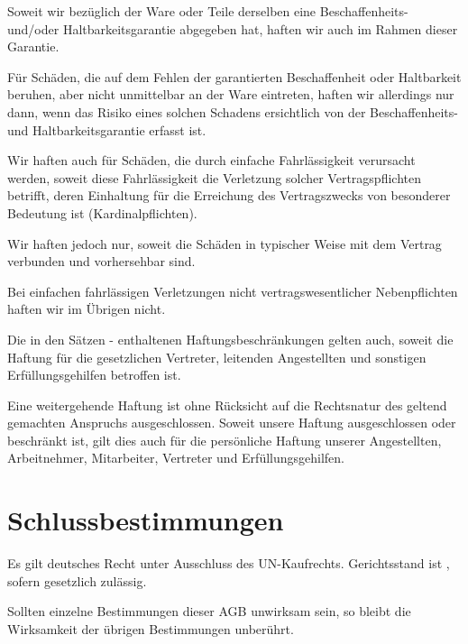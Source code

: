 \documentclass[fontsize=12pt,parskip=half]{scrartcl}
\begin{document}
\begin{contract}
Soweit wir bezüglich der Ware oder Teile derselben eine Beschaffenheits- und/oder Haltbarkeitsgarantie abgegeben hat, haften wir auch im Rahmen dieser Garantie. 

Für Schäden, die auf dem Fehlen der garantierten Beschaffenheit oder Haltbarkeit beruhen, aber nicht unmittelbar an der Ware eintreten, haften wir allerdings nur dann, wenn das Risiko eines solchen Schadens ersichtlich von der Beschaffenheits- und Haltbarkeitsgarantie erfasst ist.

Wir haften auch für Schäden, die durch einfache Fahrlässigkeit verursacht werden, soweit diese Fahrlässigkeit die Verletzung solcher Vertragspflichten betrifft, deren Einhaltung für die Erreichung des Vertragszwecks von besonderer Bedeutung ist (Kardinalpflichten).\label{ps:kardinalpflichten}

Wir haften jedoch nur, soweit die Schäden in typischer Weise mit dem Vertrag verbunden und vorhersehbar sind. 

Bei einfachen fahrlässigen Verletzungen nicht vertragswesentlicher Nebenpflichten haften wir im Übrigen nicht.\label{ps:nichtvertragswesentlich}

Die in den Sätzen - enthaltenen Haftungsbeschränkungen gelten auch, soweit die Haftung für die gesetzlichen Vertreter, leitenden Angestellten und sonstigen Erfüllungsgehilfen betroffen ist.

Eine weitergehende Haftung ist ohne Rücksicht auf die Rechtsnatur des geltend gemachten Anspruchs ausgeschlossen. Soweit unsere Haftung ausgeschlossen oder beschränkt ist, gilt dies auch für die persönliche Haftung unserer Angestellten, Arbeitnehmer, Mitarbeiter, Vertreter und Erfüllungsgehilfen.


\end{contract}

\section{Schlussbestimmungen}

\begin{contract}

Es gilt deutsches Recht unter Ausschluss des UN-Kaufrechts. Gerichtsstand ist \companyLocation{}, sofern gesetzlich zulässig.

Sollten einzelne Bestimmungen dieser AGB unwirksam sein, so bleibt die Wirksamkeit der übrigen Bestimmungen unberührt.


\end{contract}
\end{document}
